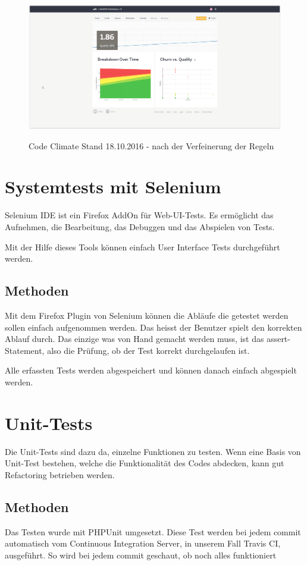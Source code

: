 \begin{figure}[H]
	\centering
	\includegraphics[width=1\textwidth
	]{Images/Stand_Beginn_181016.PNG}
	\caption{Code Climate Stand 18.10.2016 - nach der Verfeinerung der Regeln}
	\cite{codeclimate.com}
\end{figure}


\section{Systemtests mit Selenium}
Selenium IDE ist ein Firefox AddOn für Web-\acrfull{UI}-Tests. Es ermöglicht das Aufnehmen, die Bearbeitung, das Debuggen und das Abspielen von Tests. 

Mit der Hilfe dieses Tools können einfach \gls{User Interface} Tests durchgeführt werden.

\subsection{Methoden}
Mit dem Firefox Plugin von Selenium können die Abläufe die getestet werden sollen einfach aufgenommen werden. Das heisst der Benutzer spielt den korrekten Ablauf durch. Das einzige was von Hand gemacht werden muss, ist das assert-Statement, also die Prüfung, ob der Test korrekt durchgelaufen ist.

Alle erfassten Tests werden abgespeichert und können danach einfach abgespielt werden.


\section{Unit-Tests}
Die Unit-Tests sind dazu da, einzelne Funktionen zu testen. Wenn eine Basis von Unit-Test bestehen, welche die Funktionalität des Codes abdecken, kann gut Refactoring betrieben werden. 

\subsection{Methoden}
Das Testen wurde mit PHPUnit umgesetzt. Diese Test werden bei jedem commit automatisch vom Continuous Integration Server, in unserem Fall Travis CI, ausgeführt. So wird bei jedem commit geschaut, ob noch alles funktioniert


